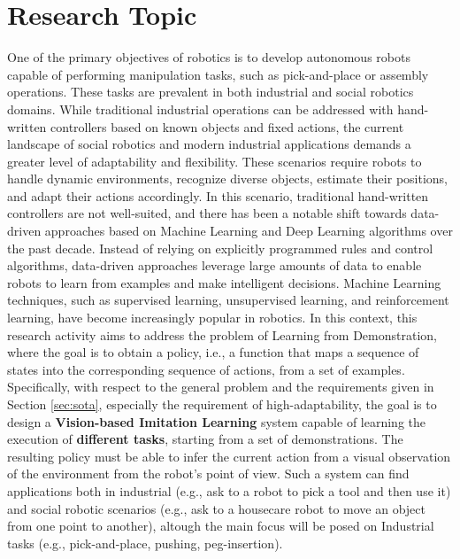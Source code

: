 \section{Research Topic}
\label{sec:research_topic}
One of the primary objectives of robotics is to develop autonomous robots capable of performing manipulation tasks, such as pick-and-place or assembly operations. These tasks are prevalent in both industrial and social robotics domains. While traditional industrial operations can be addressed with hand-written controllers based on known objects and fixed actions, the current landscape of social robotics and modern industrial applications demands a greater level of adaptability and flexibility. These scenarios require robots to handle dynamic environments, recognize diverse objects, estimate their positions, and adapt their actions accordingly.
\newline In this scenario, traditional hand-written controllers are not well-suited, and there has been a notable shift towards data-driven approaches based on Machine Learning and Deep Learning algorithms over the past decade.
\newline Instead of relying on explicitly programmed rules and control algorithms, data-driven approaches leverage large amounts of data to enable robots to learn from examples and make intelligent decisions. Machine Learning techniques, such as supervised learning, unsupervised learning, and reinforcement learning, have become increasingly popular in robotics.
\newline In this context, this research activity aims to address the problem of Learning from Demonstration, where the goal is to obtain a policy, i.e., a function that maps a sequence of states into the corresponding sequence of actions, from a set of examples. Specifically, with respect to the general problem and the requirements given in Section \ref{sec:sota}, especially the requirement of high-adaptability, the goal is to design a \textbf{Vision-based Imitation Learning} system capable of learning the execution of \textbf{different tasks},  starting from a set of demonstrations. The resulting policy must be able to infer the current action from a visual observation of the environment from the robot's point of view. Such a system can find applications both in industrial (e.g., ask to a robot to pick a tool and then use it) and social robotic scenarios (e.g., ask to a housecare robot to move an object from one point to another), altough the main focus will be posed on Industrial tasks (e.g., pick-and-place, pushing, peg-insertion).
